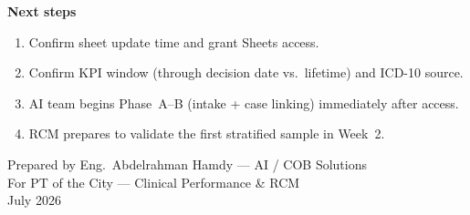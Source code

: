 \documentclass[11pt,a4paper]{article}
\begin{document}
\begin{tcolorbox}[statbox]
\begin{center}
{\bfseries\color{PrimaryBlue}Next steps}\\[0.5em]
\end{center}
\begin{enumerate}
  \item Confirm sheet update time and grant Sheets access.
  \item Confirm KPI window (through decision date vs.\ lifetime) and ICD-10 source.
  \item AI team begins Phase~A--B (intake + case linking) immediately after access.
  \item RCM prepares to validate the first stratified sample in Week~2.
\end{enumerate}
\end{tcolorbox}

\vspace{1.2em}
\begin{center}
\color{MidGray}\small
Prepared by Eng.\ Abdelrahman Hamdy --- AI / COB Solutions\\
For PT of the City --- Clinical Performance \& RCM\\
July 2026
\end{center}
\end{document}
